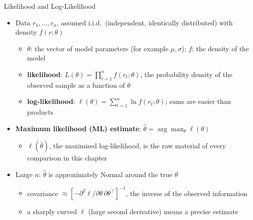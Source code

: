 \begin{frame}{Likelihood and Log-Likelihood}
\itemsize{\footnotesize}
\begin{itemize}
    \item Data $r_1, \dots, r_n$, assumed i.i.d.\ (independent, identically distributed) with density $f(r; \theta)$
    \begin{itemize}
        \item $\theta$: the vector of model parameters (for example $\mu, \sigma$); $f$: the density of the model
        \item \textbf{likelihood}: $L(\theta) = \prod_{t=1}^n f(r_t; \theta)$, the probability density of the observed sample as a function of $\theta$
        \item \textbf{log-likelihood}: $\ell(\theta) = \sum_{t=1}^n \ln f(r_t; \theta)$; sums are easier than products
    \end{itemize}
    \item \textbf{Maximum likelihood (ML) estimate}: $\hat\theta = \arg\max_\theta \ell(\theta)$
    \begin{itemize}
        \item $\ell(\hat\theta)$, the maximised log-likelihood, is the raw material of every comparison in this chapter
    \end{itemize}
    \item Large $n$: $\hat\theta$ is approximately Normal around the true $\theta$
    \begin{itemize}
        \item covariance $\approx [-\partial^2\ell/\partial\theta\,\partial\theta^\top]^{-1}$, the inverse of the observed information
        \item a sharply curved $\ell$ (large second derivative) means a precise estimate
    \end{itemize}
\end{itemize}
\end{frame}

